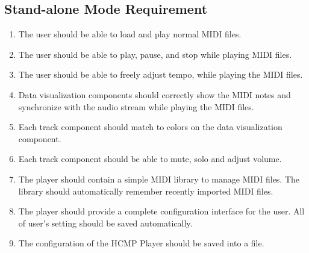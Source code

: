 \subsection{Stand-alone Mode Requirement}
\begin{enumerate}
  \item The user should be able to load and play normal MIDI files.
  \item The user should be able to play, pause, and stop while playing MIDI files.  
  \item The user should be able to freely adjust tempo, while playing the MIDI files.
  \item Data visualization components should correctly show the MIDI notes 
        and synchronize with the audio stream while playing the MIDI files.
  \item Each track component should match to colors on the data visualization 
        component.
  \item Each track component should be able to mute, solo and adjust volume.  
  \item The player should contain a simple MIDI library to manage MIDI files. 
        The library should automatically remember recently imported MIDI files.
  \item The player should provide a complete configuration interface for the 
        user. All of user's setting should be saved automatically.
  \item The configuration of the HCMP Player should be saved into a file.
\end{enumerate}

